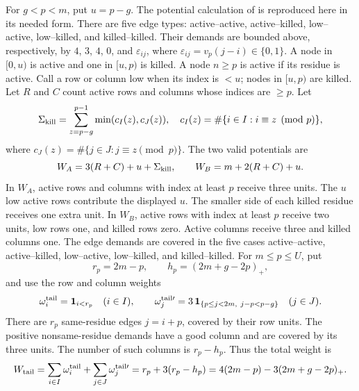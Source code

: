 For $g<p<m$, put $u=p-g$. The potential calculation of
\cite[Lemma~4.5 and Lemma~4.6, case (4)]{ZhB} is reproduced here in its
needed form. There are five edge types: active--active, active--killed,
low--active, low--killed, and killed--killed. Their demands are bounded above,
respectively, by $4$, $3$, $4$, $0$, and $\varepsilon_{ij}$, where
$\varepsilon_{ij}=v_p(j-i)\in\{0,1\}$.
A node in $[0,u)$ is active and one in
$[u,p)$ is killed. A node $n\ge p$ is active if its residue is active.
Call a row or column low when its index is $<u$; nodes in $[u,p)$ are
killed. Let $R$ and $C$ count active rows and columns whose indices are
$\ge p$. Let
\[
 \Sigma_{\rm kill}=\sum_{z=p-g}^{p-1}\min(c_I(z),c_J(z)),
 \quad c_I(z)=\#\{i\in I:i\equiv z\pmod p\},
\]
where $c_J(z)=\#\{j\in J:j\equiv z\pmod p\}$. The two valid potentials are
\begin{equation}
 W_A=3(R+C)+u+\Sigma_{\rm kill},\qquad
 W_B=m+2(R+C)+u.                                         \label{eq:5}
\end{equation}
In $W_A$, active rows and columns with index at least $p$ receive three
units. The $u$ low active rows contribute the displayed $u$. The smaller
side of each killed residue receives one extra unit. In $W_B$, active rows
with index at least $p$ receive two units, low rows one, and killed rows zero.
Active columns receive three and killed columns one. The edge demands are
covered in the five cases active--active, active--killed, low--active,
low--killed, and killed--killed. For $m\le p\le U$, put
\[
 r_p=2m-p,\qquad h_p=(2m+g-2p)_+,
\]
and use the row and column weights
\[
 \omega_i^{\rm tail}={\bf1}_{i<r_p}\quad(i\in I),\qquad
 \omega_j^{{\rm tail}\prime}=3\,\mathbf{1}_{\{p\le j<2m,\ j-p<p-g\}}
 \quad(j\in J).
\]
There are $r_p$ same-residue edges $j=i+p$, covered by their row units.
The positive nonsame-residue demands have a good column and are covered by
its three units. The number of such columns is $r_p-h_p$. Thus the total
weight is
\begin{equation}
 W_{\rm tail}=\sum_{i\in I}\omega_i^{\rm tail}
 +\sum_{j\in J}\omega_j^{{\rm tail}\prime}
 =r_p+3(r_p-h_p)=4(2m-p)-3(2m+g-2p)_+.                    \label{eq:6}
\end{equation}


